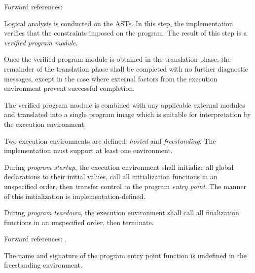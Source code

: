 Forward references: 

\specsubitem
Logical analysis is conducted on the ASTs. In this step, the implementation
verifies that the constraints imposed on the program. The result of this step is
a \textit{verified program module}.


\specsubitem
Once the verified program module is obtained in the translation phase, the
remainder of the translation phase shall be completed with no further
diagnostic messages, except in the case where external factors from the
execution environment prevent successful completion.


\specsubitem
The verified program module is combined with any applicable external modules and
translated into a single program image which is suitable for interpretation by
the execution environment.


\specsubitem
Two execution environments are defined: \textit{hosted} and
\textit{freestanding}. The implementation must support at least one environment.

\specsubitem
During \textit{program startup}, the execution environment shall initialize all
global declarations to their initial values, call all initialization functions
in an unspecified order, then transfer control to the program \textit{entry
point}. The manner of this initialization is implementation-defined.


\specsubitem
During \textit{program teardown}, the execution environment shall call all
finalization functions in an unspecified order, then terminate.

Forward references: , 


\specsubsubitem
The name and signature of the program entry point function is undefined in the
freestanding environment.

